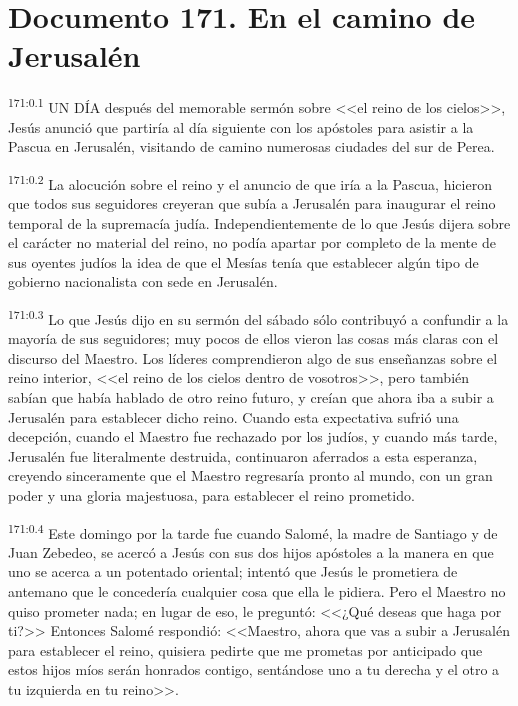 \chapter{Documento 171. En el camino de Jerusalén}
\par 
\textsuperscript{171:0.1} UN DÍA después del memorable sermón sobre <<el reino de los cielos>>, Jesús anunció que partiría al día siguiente con los apóstoles para asistir a la Pascua en Jerusalén, visitando de camino numerosas ciudades del sur de Perea.

\par 
\textsuperscript{171:0.2} La alocución sobre el reino y el anuncio de que iría a la Pascua, hicieron que todos sus seguidores creyeran que subía a Jerusalén para inaugurar el reino temporal de la supremacía judía. Independientemente de lo que Jesús dijera sobre el carácter no material del reino, no podía apartar por completo de la mente de sus oyentes judíos la idea de que el Mesías tenía que establecer algún tipo de gobierno nacionalista con sede en Jerusalén.

\par 
\textsuperscript{171:0.3} Lo que Jesús dijo en su sermón del sábado sólo contribuyó a confundir a la mayoría de sus seguidores; muy pocos de ellos vieron las cosas más claras con el discurso del Maestro. Los líderes comprendieron algo de sus enseñanzas sobre el reino interior, <<el reino de los cielos dentro de vosotros>>, pero también sabían que había hablado de otro reino futuro, y creían que ahora iba a subir a Jerusalén para establecer dicho reino. Cuando esta expectativa sufrió una decepción, cuando el Maestro fue rechazado por los judíos, y cuando más tarde, Jerusalén fue literalmente destruida, continuaron aferrados a esta esperanza, creyendo sinceramente que el Maestro regresaría pronto al mundo, con un gran poder y una gloria majestuosa, para establecer el reino prometido.

\par 
\textsuperscript{171:0.4} Este domingo por la tarde fue cuando Salomé, la madre de Santiago y de Juan Zebedeo, se acercó a Jesús con sus dos hijos apóstoles a la manera en que uno se acerca a un potentado oriental; intentó que Jesús le prometiera de antemano que le concedería cualquier cosa que ella le pidiera. Pero el Maestro no quiso prometer nada; en lugar de eso, le preguntó: <<¿Qué deseas que haga por ti?>> Entonces Salomé respondió: <<Maestro, ahora que vas a subir a Jerusalén para establecer el reino, quisiera pedirte que me prometas por anticipado que estos hijos míos serán honrados contigo, sentándose uno a tu derecha y el otro a tu izquierda en tu reino>>.

